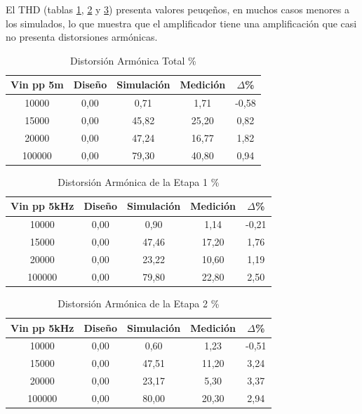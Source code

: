 El THD (tablas \ref{tab:thd_t}, \ref{tab:thd_e1} y \ref{tab:thd_e2}) presenta valores peuqeños, en muchos casos menores a los simulados, lo que muestra que el amplificador tiene una amplificación que casi no presenta distorsiones armónicas.

\begin{table}[H]
\centering
\begin{tabular}{|c|c|c|c|c|}
\hline
\textbf{Vin pp 5m} & \textbf{Diseño} & \textbf{Simulación} & \textbf{Medición} & \textbf{$\Delta$\%} \\ \hline
10000 & 0,00 & 0,71 & 1,71 & -0,58 \\ \hline
15000 & 0,00 & 45,82 & 25,20 & 0,82 \\ \hline
20000 & 0,00 & 47,24 & 16,77 & 1,82 \\ \hline
100000 & 0,00 & 79,30 & 40,80 & 0,94 \\ \hline
\end{tabular}
\caption{Distorsión Armónica Total \%}
\label{tab:thd_t}
\end{table}


\begin{table}[H]
\centering
\begin{tabular}{|c|c|c|c|c|}
\hline
\textbf{Vin pp 5kHz} & \textbf{Diseño} & \textbf{Simulación} & \textbf{Medición} & \textbf{$\Delta$\%} \\ \hline
10000 & 0,00 & 0,90 & 1,14 & -0,21 \\ \hline
15000 & 0,00 & 47,46 & 17,20 & 1,76 \\ \hline
20000 & 0,00 & 23,22 & 10,60 & 1,19 \\ \hline
100000 & 0,00 & 79,80 & 22,80 & 2,50 \\ \hline
\end{tabular}
\caption{Distorsión Armónica de la Etapa 1 \%}
\label{tab:thd_e1}
\end{table}


\begin{table}[H]
\centering
\begin{tabular}{|c|c|c|c|c|}
\hline
\textbf{Vin pp 5kHz} & \textbf{Diseño} & \textbf{Simulación} & \textbf{Medición} & \textbf{$\Delta$\%} \\ \hline
10000 & 0,00 & 0,60 & 1,23 & -0,51 \\ \hline
15000 & 0,00 & 47,51 & 11,20 & 3,24 \\ \hline
20000 & 0,00 & 23,17 & 5,30 & 3,37 \\ \hline
100000 & 0,00 & 80,00 & 20,30 & 2,94 \\ \hline
\end{tabular}
\caption{Distorsión Armónica de la Etapa 2 \%}
\label{tab:thd_e2}
\end{table}